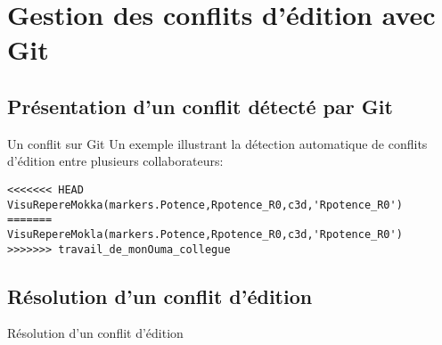 \documentclass{beamer}
\begin{document}

\section{Gestion des conflits d'édition avec Git}


\subsection{Présentation d'un conflit détecté par Git}
\begin{frame}[fragile]{Un conflit sur Git}
Un exemple illustrant la détection automatique de conflits d'édition entre plusieurs collaborateurs:
\begin{mdframed}[style=Bash]
\begin{lstlisting}[style=Bash, caption={Exemple de détection automatique de conflit d'édition}]
<<<<<<< HEAD
VisuRepereMokka(markers.Potence,Rpotence_R0,c3d,'Rpotence_R0')
=======
VisuRepereMokla(markers.Potence,Rpotence_R0,c3d,'Rpotence_R0')
>>>>>>> travail_de_monOuma_collegue
\end{lstlisting}
\end{mdframed}
\end{frame}


\subsection{Résolution d'un conflit d'édition}
\begin{frame}{Résolution d'un conflit d'édition}
    
\end{frame}
\end{document}
